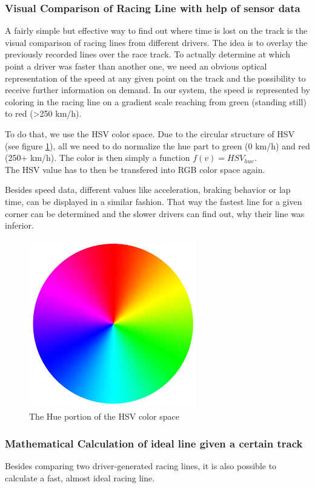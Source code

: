 \subsubsection{Visual Comparison of Racing Line with help of sensor data}
A fairly simple but effective way to find out where time is lost on the track is the visual comparison of racing lines from different drivers. The idea is to overlay the previously recorded lines over the race track. To actually determine at which point a driver was faster than another one, we need an obvious optical representation of the speed at any given point on the track and the possibility to receive further information on demand.
In our system, the speed is represented by coloring in the racing line on a gradient scale reaching from green (standing still) to red (>250 km/h).

To do that, we use the HSV color space. Due to the circular structure of HSV (see figure \ref{fig:hsv_gradient}), all we need to do normalize the hue part to green (0 km/h) and red (250+ km/h). The color is then simply a function $f(v) = HSV_{hue}$.\\
The HSV value has to then be transfered into RGB color space again.

Besides speed data, different values like acceleration, braking behavior or lap time, can be displayed in a similar fashion. That way the fastest line for a given corner can be determined and the slower drivers can find out, why their line was inferior.

\begin{figure}[!ht]
\centering
\includegraphics[width=.3\textwidth]{gradient_hsv}
\caption{The Hue portion of the HSV color space}
\label{fig:hsv_gradient}
\end{figure}

\subsubsection{Mathematical Calculation of ideal line given a certain track}
Besides comparing two driver-generated racing lines, it is also possible to calculate a fast, almost ideal racing line.

